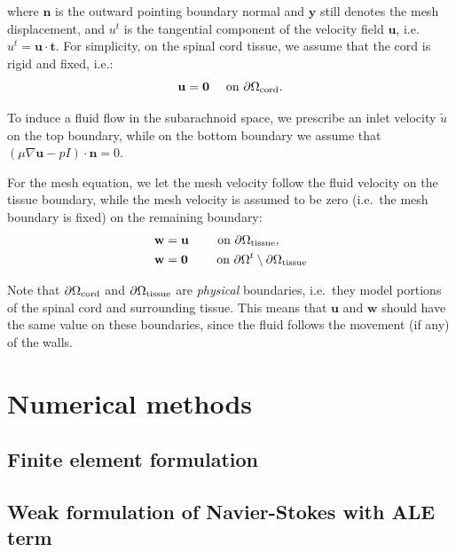 \documentclass[11pt,a4paper,titlepage]{report}
\begin{document}
where $\mathbf{n}$ is the outward pointing boundary normal and
$\mathbf{y}$ still denotes the mesh displacement, and $u^t$ is the tangential component of the velocity field $\mathbf{u}$, i.e. $u^t = \mathbf{u} \cdot \mathbf{t}$. For simplicity, on
the spinal cord tissue, we assume that the cord is rigid and fixed,
i.e.:
\begin{equation}
  \mathbf{u} = \mathbf{0} \quad \text { on } \partial \Omega_{\rm cord}.
\end{equation}

To induce a fluid flow in the subarachnoid space, we prescribe an
inlet velocity $\tilde{u}$ on the top boundary, while on the bottom
boundary we assume that $ \left ( \mu \nabla \mathbf{u} - p I \right )
\cdot \mathbf{n} = 0$.

For the mesh equation, we let the mesh velocity follow the fluid
velocity on the tissue boundary, while the mesh velocity is assumed to
be zero (i.e.~the mesh boundary is fixed) on the remaining boundary:
\begin{align}
\mathbf{w} &= \mathbf{u}  \qquad \text{ on } \partial \Omega_{\rm tissue},\\
\mathbf{w} &= \mathbf{0}  \qquad \text{ on } \partial \Omega^t \setminus \partial \Omega_{\rm tissue}
\end{align}

Note that $\partial \Omega_{\rm cord}$ and $\partial \Omega_{\rm
  tissue}$ are \textit{physical} boundaries, i.e.~they model portions
of the spinal cord and surrounding tissue. This means that
$\mathbf{u}$ and $\mathbf{w}$ should have the same value on these
boundaries, since the fluid follows the movement (if any) of the
walls.


\chapter{Numerical methods}

\section{Finite element formulation}

\section{Weak formulation of Navier-Stokes with ALE term}
\end{document}
